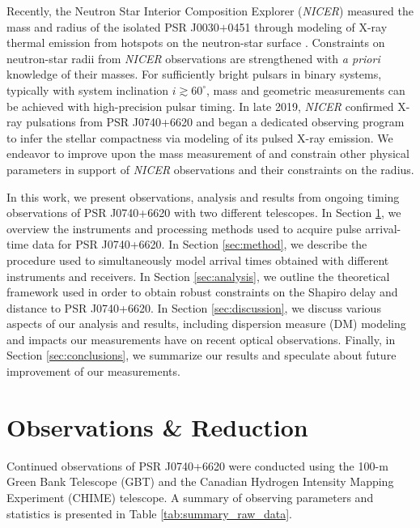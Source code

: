 \documentclass[twocolumn]{aastex63}
\newcommand{\nicer}{{\it NICER}}
\begin{document}
Recently, the Neutron Star Interior Composition Explorer (\nicer) measured the mass and radius of the isolated PSR J0030$+$0451 through modeling of X-ray thermal emission from hotspots on the neutron-star surface \citep{bgr+19,mld+19,rrw+19,rwb+19}. Constraints on neutron-star radii from \nicer{} observations are strengthened with {\it a priori} knowledge of their masses. For sufficiently bright pulsars in binary systems, typically with system inclination $i \gtrsim 60^\circ$, mass and geometric measurements can be achieved with high-precision pulsar timing. In late 2019, \nicer{} confirmed X-ray pulsations from PSR J0740+6620 \citep{wol+21} and began a dedicated observing program to infer the stellar compactness via modeling of its pulsed X-ray emission. We endeavor to improve upon the mass measurement of \citet{cfr+20} and constrain other physical parameters in support of \nicer{} observations and their constraints on the radius.

In this work, we present observations, analysis and results from ongoing timing observations of PSR J0740+6620 with two different telescopes. In Section \ref{sec:obs}, we overview the instruments and processing methods used to acquire pulse arrival-time data for PSR J0740+6620. In Section \ref{sec:method}, we describe the procedure used to simultaneously model arrival times obtained with different instruments and receivers. In Section \ref{sec:analysis}, we outline the theoretical framework used in order to obtain robust constraints on the Shapiro delay and distance to PSR J0740+6620. In Section \ref{sec:discussion}, we discuss various aspects of our analysis and results, including dispersion measure (DM) modeling and impacts our measurements have on recent optical observations. Finally, in Section \ref{sec:conclusions}, we summarize our results and speculate about future improvement of our measurements.

\section{Observations \& Reduction}
\label{sec:obs}
Continued observations of PSR J0740+6620 were conducted using the 100-m Green Bank Telescope (GBT) and the Canadian Hydrogen Intensity Mapping Experiment (CHIME) telescope. A summary of observing parameters and statistics is presented in Table \ref{tab:summary_raw_data}.


\end{document}
